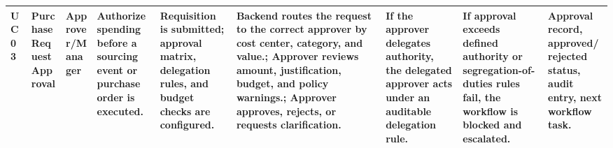 \documentclass[conference]{IEEEtran}
\begin{document}
\begin{table}[!t]
\begin{tabularx}{\textwidth}{|L{0.75cm}|L{1.8cm}|L{1.6cm}|Y|Y|Y|Y|Y|Y|}
UC03 & Purchase Request Approval & Approver/Manager & Authorize spending before a sourcing event or purchase order is executed. & Requisition is submitted; approval matrix, delegation rules, and budget checks are configured. & Backend routes the request to the correct approver by cost center, category, and value.; Approver reviews amount, justification, budget, and policy warnings.; Approver approves, rejects, or requests clarification. & If the approver delegates authority, the delegated approver acts under an auditable delegation rule. & If approval exceeds defined authority or segregation-of-duties rules fail, the workflow is blocked and escalated. & Approval record, approved/rejected status, audit entry, next workflow task. \\ \hline
\end{tabularx}
\end{table}
\end{document}
